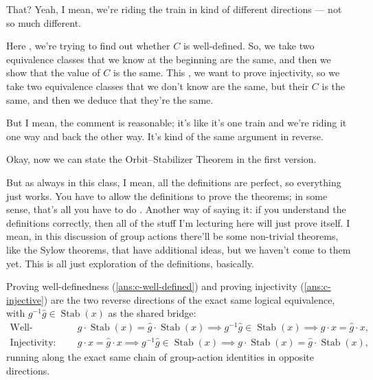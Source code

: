 \begin{speech}[00:33:08 - 00:34:58]
That? Yeah, I mean, we're riding the train in kind of different directions --- not so much different.

Here , we're trying to find out whether $C$ is well-defined. So, we take two equivalence classes that we know at the beginning are the same, and then we show that the value of $C$ is the same. This , we want to prove injectivity, so we take two equivalence classes that we don't know are the same, but their $C$ is the same, and then we deduce that they're the same.

But I mean, the comment is reasonable; it's like it's one train and we're riding it one way and back the other way. It's kind of the same argument in reverse.

Okay, now we can state the Orbit--Stabilizer Theorem in the first version.

But as always in this class, I mean, all the definitions are perfect, so everything just works. You have to allow the definitions to prove the theorems; in some sense, that's all you have to do . Another way of saying it: if you understand the definitions correctly, then all of the stuff I'm lecturing here will just prove itself. I mean, in this discussion of group actions there'll be some non-trivial theorems, like the Sylow theorems, that have additional ideas, but we haven't come to them yet. This is all just exploration of the definitions, basically.
\end{speech}

\begin{insight}
Proving well-definedness (\cref{ans:c-well-defined}) and proving injectivity (\cref{ans:c-injective}) are the two reverse directions of the exact same logical equivalence, with $g^{-1}\hat{g} \in \operatorname{Stab}(x)$ as the shared bridge:
\begin{align*}
\text{Well-definedness:} \quad & g \cdot \operatorname{Stab}(x) = \hat{g} \cdot \operatorname{Stab}(x) \implies g^{-1}\hat{g} \in \operatorname{Stab}(x) \implies g \cdot x = \hat{g} \cdot x, \\
\text{Injectivity:} \quad & g \cdot x = \hat{g} \cdot x \implies g^{-1}\hat{g} \in \operatorname{Stab}(x) \implies g \cdot \operatorname{Stab}(x) = \hat{g} \cdot \operatorname{Stab}(x),
\end{align*}
running along the exact same chain of group-action identities in opposite directions.
\end{insight}

